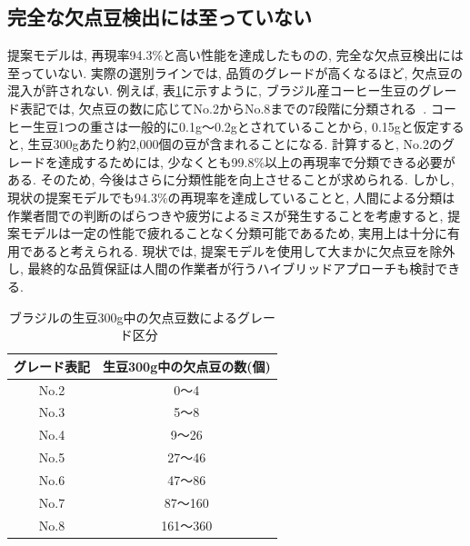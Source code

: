 \subsection{完全な欠点豆検出には至っていない}
提案モデルは, 再現率94.3\%と高い性能を達成したものの, 完全な欠点豆検出には至っていない. 
実際の選別ラインでは, 品質のグレードが高くなるほど, 欠点豆の混入が許されない.
例えば, 表\ref{table:brazil_grade}に示すように, ブラジル産コーヒー生豆のグレード表記では, 欠点豆の数に応じてNo.2からNo.8までの7段階に分類される~\cite{dscoffee_grade}.
コーヒー生豆1つの重さは一般的に0.1g〜0.2gとされていることから, 0.15gと仮定すると, 生豆300gあたり約2,000個の豆が含まれることになる.
計算すると, No.2のグレードを達成するためには, 少なくとも99.8\%以上の再現率で分類できる必要がある.
そのため, 今後はさらに分類性能を向上させることが求められる. 
しかし, 現状の提案モデルでも94.3\%の再現率を達成していることと, 人間による分類は作業者間での判断のばらつきや疲労によるミスが発生することを考慮すると, 提案モデルは一定の性能で疲れることなく分類可能であるため, 実用上は十分に有用であると考えられる. 
現状では, 提案モデルを使用して大まかに欠点豆を除外し, 最終的な品質保証は人間の作業者が行うハイブリッドアプローチも検討できる.

\begin{table}[htbp]
\caption[ブラジルの生豆300g中の欠点豆数によるグレード区分]{ブラジルの生豆300g中の欠点豆数によるグレード区分~\cite{dscoffee_grade}}
\label{table:brazil_grade}
\begin{center}
\begin{tabular}{cc} \hline
グレード表記 & 生豆300g中の欠点豆の数(個) \\\hline
No.2 & 0〜4 \\
No.3 & 5〜8 \\
No.4 & 9〜26 \\
No.5 & 27〜46 \\
No.6 & 47〜86 \\
No.7 & 87〜160 \\
No.8 & 161〜360 \\\hline
\end{tabular}
\end{center}
\end{table}

